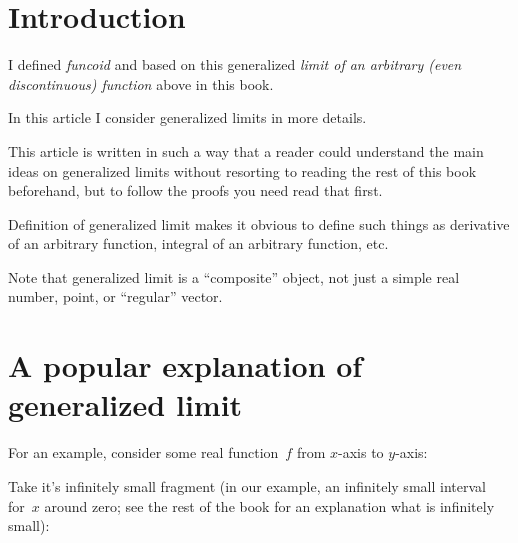 \chapter{Introduction}

I defined \emph{funcoid} and based on this generalized \emph{limit of an arbitrary (even discontinuous) function} above in this book.

In this article I consider generalized limits in more details.

This article is written in such a way that a reader could understand the main ideas on generalized limits without resorting to reading the rest of this book beforehand, but to follow the proofs you need read that first.

Definition of generalized limit makes it obvious to define such things as derivative of an arbitrary function, integral of an arbitrary function, etc.

Note that generalized limit is a ``composite'' object, not just a simple real number, point, or ``regular'' vector.

\chapter{A popular explanation of generalized limit}

For an example, consider some real function~$f$ from $x$-axis to $y$-axis:
\begin{figure}[H]
\end{figure}
 
Take it's infinitely small fragment (in our example, an infinitely small interval for~$x$ around zero; see the rest of the book for an explanation what is infinitely small):
\begin{figure}[H]
\end{figure}

